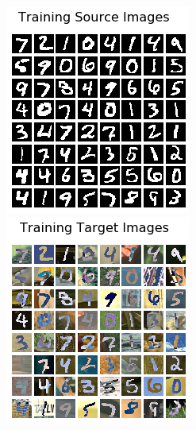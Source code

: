 \documentclass{article}
\begin{document}
\begin{figure}
\begin{minipage}[t]{0.5\textwidth}
\begin{minipage}[t]{0.48\textwidth}
      \includegraphics[width=0.85\linewidth]{DSN/source.png}
    \end{minipage}
    \hfill
    \begin{minipage}[t]{0.48\textwidth}
      \includegraphics[width=0.85\linewidth]{DSN/target.png}

\end{minipage}
\end{minipage}
\end{figure}
\end{document}
